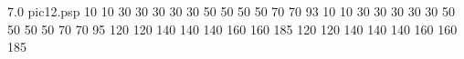  7.0 pic12.psp 
{}{}{
 10 
 10 
 30 
 30 
 30 
 30 
 30 
 50 
 50 
 50 
 50 
 70 
 70 
 93 
 10 
 10 
 30 
 30 
 30 
 30 
 30 
 50 
 50 
 50 
 50 
 70 
 70 
 95 
 120 
 120 
 140 
 140 
 140 
 160 
 160 
 185 
 120 
 120 
 140 
 140 
 140 
 160 
 160 
 185 
}
